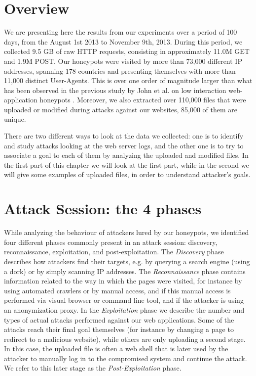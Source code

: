 \section{Overview}

We are presenting here the results from our experiments over a period of 100 days, from the August 1st 2013 to November 9th, 2013. During this period, we collected 9.5 GB of raw HTTP requests, consisting in approximately 11.0M GET and 1.9M POST. Our honeypots were visited by more than 73,000 different IP addresses, spanning 178 countries and presenting themselves with more than 11,000 distinct User-Agents. This is over one order of magnitude larger than what has been observed in the previous study by John et al. on low interaction web-application honeypots \cite{johnhsh}. Moreover, we also extracted over 110,000 files that were uploaded or modified during attacks against our websites, 85,000 of them are unique.

There are two different ways to look at the data we collected: one is to identify and study attacks looking at the web server logs, and the other one is to try to associate a goal to each of them by analyzing the uploaded and modified files. In the first part of this chapter we will look at the first part, while in the second we will give some examples of uploaded files, in order to understand attacker's goals.

\section{Attack Session: the 4 phases}

While analyzing the behaviour of attackers lured by our honeypots, we identified four different phases commonly present in an attack session: discovery, reconnaissance, exploitation, and post-exploitation. The \emph{Discovery} phase describes how attackers find their targets, e.g. by querying a search engine (using a dork) or by simply scanning IP addresses. The \emph{Reconnaissance} phase contains information related to the way in which the pages were visited, for instance by using automated crawlers or by manual access, and if this manual access is performed via visual browser or command line tool, and if the attacker is using an anonymization proxy. In the \emph{Exploitation} phase we describe the number and types of actual attacks performed against our web applications. Some of the attacks reach their final goal themselves (for instance by changing a page to redirect to a malicious website), while others are only uploading a second stage. In this case, the uploaded file is often a web shell that is later used by the attacker to manually log in to the compromised system and continue the attack. We refer to this later stage as the \emph{Post-Exploitation} phase.

